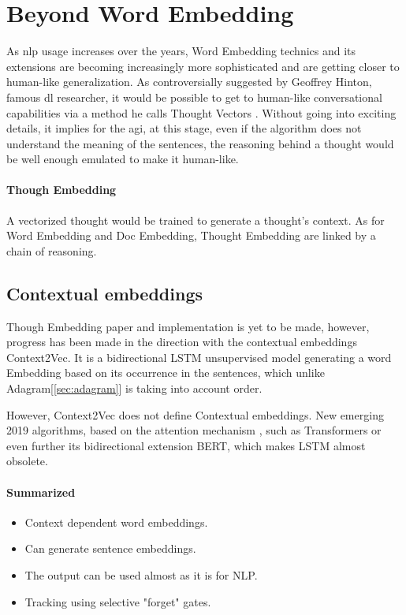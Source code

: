 \section{Beyond Word Embedding}
As \gls{nlp} usage increases over the years, Word Embedding technics and its extensions are becoming increasingly more sophisticated and are getting closer to human-like generalization. As controversially suggested by Geoffrey Hinton, famous \gls{dl} researcher, it would be possible to get to human-like conversational capabilities via a method he calls Thought Vectors \cite{article:thought2vec-geoffrey-hinton}. Without going into exciting details, it implies for the \gls{agi}, at this stage, even if the algorithm does not understand the meaning of the sentences, the reasoning behind a thought would be well enough emulated to make it human-like.

\paragraph{Though Embedding}
A vectorized thought would be trained to generate a thought's context. As for Word Embedding and Doc Embedding,  Thought Embedding are linked by a chain of reasoning.

\subsection{Contextual embeddings}
Though Embedding paper and implementation is yet to be made, however, progress has been made in the direction with the contextual embeddings Context2Vec\cite{article:context2vec}. It is a bidirectional LSTM\cite{article:lstm} unsupervised model generating a word Embedding based on its occurrence in the sentences, which unlike Adagram[\ref{sec:adagram}] is taking into account order. 


However, Context2Vec does not define Contextual embeddings. New emerging 2019 algorithms, based on the attention mechanism \cite{article:attention-is-all-you-need}, such as Transformers\cite{article:transformer} or even further its bidirectional extension BERT\cite{article:bert}, which makes LSTM almost obsolete.

\paragraph{Summarized}
\begin{itemize}
    \setlength\itemsep{0em}
    \item Context dependent word embeddings.
    \item Can generate sentence embeddings.
    \item The output can be used almost as it is for NLP.
    \item Tracking using selective "forget" gates.
\end{itemize}


